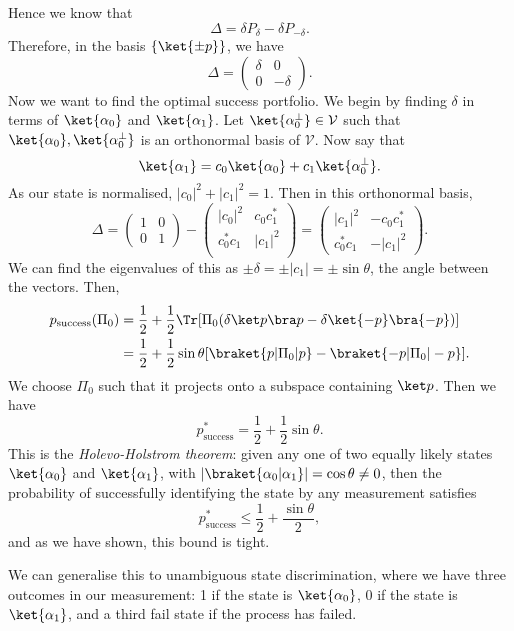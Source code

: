 \documentclass[12pt]{article}
\begin{document}
Hence we know that
\[
\Delta = \delta P_{\delta} - \delta P_{-\delta}.
\]
Therefore, in the basis $\{\ket{\pm p}\}$, we have
\[
\Delta =
\begin{pmatrix}
	\delta & 0 \\ 0 & -\delta
\end{pmatrix}.
\]
Now we want to find the optimal success portfolio. We begin by finding $\delta$ in terms of $\ket{\alpha_0}$ and $\ket{\alpha_1}$. Let $\ket{\alpha_0^\perp} \in \mathcal{V}$ such that $\ket{\alpha_0}, \ket{\alpha_0^\perp}$ is an orthonormal basis of $\mathcal{V}$. Now say that
\[
	\ket{\alpha_1} = c_0 \ket{\alpha_0} + c_1 \ket{\alpha_0^{\perp}}.
\]
As our state is normalised, $|c_0|^2 + |c_1|^2 = 1$. Then in this orthonormal basis,
\[
\Delta =
\begin{pmatrix}
	1 & 0 \\ 0 & 1
\end{pmatrix}
-
\begin{pmatrix}
	|c_0|^2 & c_0 c_1^{\ast} \\ c_0^{\ast} c_1 & |c_1|^2 \\
\end{pmatrix}
=
\begin{pmatrix}
	|c_1|^2 & -c_0c_1^{\ast} \\ c_0^{\ast} c_1 & -|c_1|^2
\end{pmatrix}.
\]
We can find the eigenvalues of this as $\pm \delta = \pm |c_1| = \pm \sin \theta$, the angle between the vectors. Then,
\begin{align*}
	p_{\mathrm{success}}(\Pi_0) &= \frac{1}{2} + \frac{1}{2} \Tr [ \Pi_0(\delta \ket p \bra p - \delta \ket{-p} \bra{-p})] \\
				    &= \frac{1}{2} + \frac{1}{2} \sin \theta [\braket{p|\Pi_0|p} - \braket{-p|\Pi_0|-p}].
\end{align*}
We choose $\Pi_0$ such that it projects onto a subspace containing $\ket p$. Then we have
\[
p_{\mathrm{success}}^{\ast} = \frac{1}{2} + \frac{1}{2} \sin \theta.
\]
This is the \emph{Holevo-Holstrom theorem}: given any one of two equally likely states $\ket{\alpha_0}$ and $\ket{\alpha_1}$, with $|\braket{\alpha_0|\alpha_1}| = \cos \theta \neq 0$, then the probability of successfully identifying the state by any measurement satisfies
\[
	p_{\mathrm{success}}^{\ast} \leq \frac{1}{2} + \frac{\sin \theta}{2},
\]
and as we have shown, this bound is tight.

We can generalise this to unambiguous state discrimination, where we have three outcomes in our measurement: 1 if the state is $\ket{\alpha_0}$, 0 if the state is $\ket{\alpha_1}$, and a third fail state if the process has failed.
\end{document}
